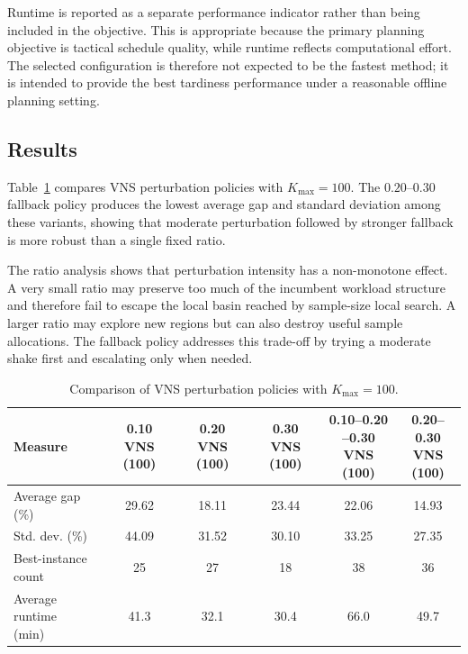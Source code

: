 \documentclass[11pt]{article}
\begin{document}
Runtime is reported as a separate performance indicator rather than being included in the objective. This is appropriate because the primary planning objective is tactical schedule quality, while runtime reflects computational effort. The selected configuration is therefore not expected to be the fastest method; it is intended to provide the best tardiness performance under a reasonable offline planning setting.

\subsection{Results}
\label{subsec:results}

Table~\ref{tab:vns_ratio_comparison_short} compares VNS perturbation policies with \(K_{\max}=100\). The \(0.20\)--\(0.30\) fallback policy produces the lowest average gap and standard deviation among these variants, showing that moderate perturbation followed by stronger fallback is more robust than a single fixed ratio.

The ratio analysis shows that perturbation intensity has a non-monotone effect. A very small ratio may preserve too much of the incumbent workload structure and therefore fail to escape the local basin reached by sample-size local search. A larger ratio may explore new regions but can also destroy useful sample allocations. The fallback policy addresses this trade-off by trying a moderate shake first and escalating only when needed.

\begin{table}[H]
\centering
\caption{Comparison of VNS perturbation policies with \(K_{\max}=100\).}
\label{tab:vns_ratio_comparison_short}
\small
\begin{tabular}{lccccc}
\hline
\textbf{Measure}
&
\shortstack{\textbf{0.10}\\\textbf{VNS (100)}}
&
\shortstack{\textbf{0.20}\\\textbf{VNS (100)}}
&
\shortstack{\textbf{0.30}\\\textbf{VNS (100)}}
&
\shortstack{\textbf{0.10--0.20}\\\textbf{--0.30}\\\textbf{VNS (100)}}
&
\shortstack{\textbf{0.20--0.30}\\\textbf{VNS}\\\textbf{(100)}} \\
\hline
Average gap (\%) & 29.62 & 18.11 & 23.44 & 22.06 & 14.93 \\
Std. dev. (\%) & 44.09 & 31.52 & 30.10 & 33.25 & 27.35 \\
\shortstack[l]{Best-instance\\count} & 25 & 27 & 18 & 38 & 36 \\
\shortstack[l]{Average runtime\\(min)} & 41.3 & 32.1 & 30.4 & 66.0 & 49.7 \\
\hline
\end{tabular}
\end{table}
\end{document}
